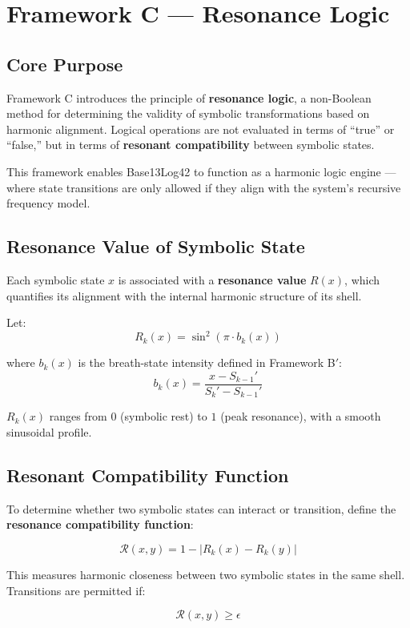 \section*{Framework C — Resonance Logic}

\subsection*{Core Purpose}

Framework C introduces the principle of \textbf{resonance logic}, a non-Boolean method for determining the validity of symbolic transformations based on harmonic alignment. Logical operations are not evaluated in terms of ``true'' or ``false,'' but in terms of \textbf{resonant compatibility} between symbolic states.

This framework enables Base13Log42 to function as a harmonic logic engine — where state transitions are only allowed if they align with the system’s recursive frequency model.

\subsection*{Resonance Value of Symbolic State}

Each symbolic state $x$ is associated with a \textbf{resonance value} $R(x)$, which quantifies its alignment with the internal harmonic structure of its shell.

Let:
\[
R_k(x) = \sin^2\left( \pi \cdot b_k(x) \right)
\]

where $b_k(x)$ is the breath-state intensity defined in Framework B$'$:
\[
b_k(x) = \frac{x - S_{k-1}'}{S_k' - S_{k-1}'}
\]

$R_k(x)$ ranges from $0$ (symbolic rest) to $1$ (peak resonance), with a smooth sinusoidal profile.

\subsection*{Resonant Compatibility Function}

To determine whether two symbolic states can interact or transition, define the \textbf{resonance compatibility function}:

\[
\mathcal{R}(x, y) = 1 - \left| R_k(x) - R_k(y) \right|
\]

This measures harmonic closeness between two symbolic states in the same shell. Transitions are permitted if:

\[
\mathcal{R}(x, y) \geq \epsilon
\]


